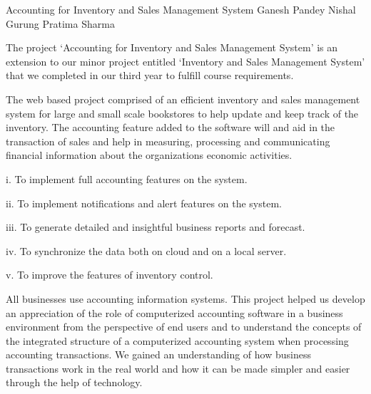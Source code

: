  \begin{conf-abstract}[]
 {Accounting for Inventory and Sales Management System}
 { Ganesh Pandey
 	Nishal Gurung
 	Pratima Sharma
 }
{}

The project ‘Accounting for Inventory and Sales Management System’ is an extension to our minor project entitled ‘Inventory and Sales Management System’ that we completed in our third year to fulfill course requirements.

The web based project comprised of an efficient inventory and sales management system for large and small scale bookstores to help update and keep track of the inventory. The accounting feature added to the software will and aid in the transaction of sales and help in measuring, processing and communicating financial information about the organizations economic activities.

i.	To implement full accounting features on the system.

ii.	To implement notifications and alert features on the system.

iii.	To generate detailed and insightful business reports and forecast.

iv.	To synchronize the data both on cloud and on a local server. 

v.	To improve the features of inventory control.

All businesses use accounting information systems. This project helped us develop an appreciation of the role of computerized accounting software in a business environment from the perspective of end users and to understand the concepts of the integrated structure of a computerized accounting system when processing accounting transactions. 
We gained an understanding of how business transactions work in the real world and how it can be made simpler and easier through the help of technology.

\end{conf-abstract}